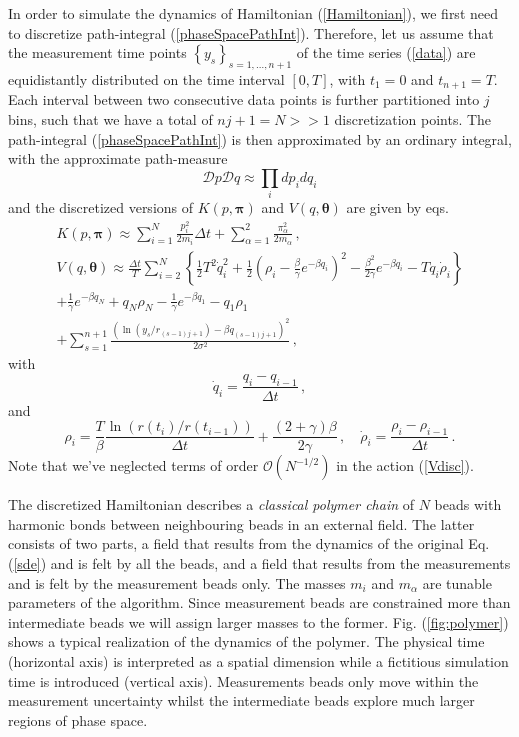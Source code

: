 \documentclass[12pt,a4paper,final]{iopart}
\newcommand{\bt}{\pmb\theta}
\begin{document}
In order to simulate the dynamics of Hamiltonian (\ref{Hamiltonian}), we first need to discretize path-integral (\ref{phaseSpacePathInt}).
Therefore, let us assume that the measurement time points $\left\{ y_s \right\}_{s=1,\dots, n+1}$ of the time series (\ref{data}) are equidistantly distributed on the time interval $[0,T]$, with $t_1=0$ and $t_{n+1}=T$.
Each interval between two consecutive data points is further partitioned into $j$ bins, such that we have a total of $nj+1=N>>1$ discretization points.
The path-integral (\ref{phaseSpacePathInt}) is then approximated by an ordinary integral, with the approximate path-measure
\begin{equation}
  \mathcal Dp\mathcal Dq
  \approx
  \prod_i dp_i dq_i
\end{equation}
and the discretized versions of $K( p,{\pmb\pi})$ and $V( q,\bt)$ are given by eqs.
\begin{eqnarray}
   K( p,{\pmb\pi}) \approx
   \sum_{i=1}^N
   \frac{ p_i^2}{2m_i}\Delta t
   +
   \sum_{\alpha=1}^2\frac{\pi_\alpha^2}{2m_\alpha}\,,\label{Kdisc}
   \\
   V(q,\bt) \approx \frac{\Delta t}{T} \sum_{i=2}^{N}
   \left\{ \frac{1}{2} T^2 \dot q_i^2 + \frac{1}{2}
     \left( \rho_i-\frac{\beta}{\gamma}e^{-\beta q_i} \right)^2 -
    \frac{\beta^2}{2\gamma} e^{-\beta q_i} - T q_i\dot\rho_i \right\}  \nonumber
  \\
  +
  \frac{1}{\gamma}
  e^{-\beta q_N}
  +
  q_N \rho_{N}
  -
  \frac{1}{\gamma}
  e^{-\beta q_1}
  -
  q_1 \rho_{1}
  \nonumber
  \\
  +
  \sum_{s=1}^{n+1}
  \frac{(\ln(y_s/r_{(s-1)j+1}) - {\beta q_{(s-1)j+1}})^2}{2\sigma^2}
  \label{Vdisc}
   \,,
\end{eqnarray}
with
\begin{equation}
  \dot q_i = \frac{q_i-q_{i-1}}{\Delta t}\,,
\end{equation}
and
\begin{equation}\label{rhodisc}
\rho_i = \frac{T}{\beta} \frac{\ln(r(t_{i})/r(t_{i-1}))}{\Delta t}
+
\frac{(2+\gamma)\beta}{2\gamma}
\,,\quad
\dot\rho_i = \frac{\rho_i-\rho_{i-1}}{\Delta t}\,.
\end{equation}
Note that we've neglected terms of order $\mathcal O(N^{-1/2})$ in the action (\ref{Vdisc}).

The discretized Hamiltonian describes a {\em classical polymer chain} of $N$ beads with harmonic bonds between neighbouring beads in an external field. The latter consists of two parts, a field that results from the dynamics of the original Eq. (\ref{sde}) and is felt by all the beads, and a field that results from the measurements and is felt by the measurement beads only. The masses $m_i$ and $m_{\alpha}$ are tunable parameters of the algorithm.
Since measurement beads are constrained more than intermediate beads we will assign larger masses to the former.
Fig. (\ref{fig:polymer}) shows a typical realization of the dynamics of the polymer.
The physical time (horizontal axis) is interpreted as a spatial dimension while a fictitious simulation time is introduced (vertical axis).
Measurements beads only move within the measurement uncertainty whilst the intermediate beads explore much larger regions of phase space.
\end{document}
